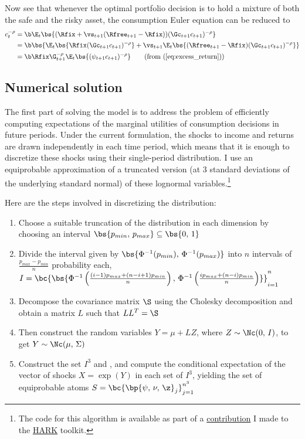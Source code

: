 Now see that whenever the optimal portfolio decision is to hold a mixture of both the safe and the risky asset, the consumption Euler equation can be reduced to
\begin{align*}
    c_{t}^{-\rho} &= \b \E_{t}\bs{(\Rfix + \vs_{t+1}(\Rfree_{t+1} - \Rfix))(\Gc_{t+1}c_{t+1})^{-\rho}}\\
    &= \b \bs{\E_{t}\bs{\Rfix(\Gc_{t+1}c_{t+1})^{-\rho}} + \vs_{t+1}\E_{t}\bs{(\Rfree_{t+1} - \Rfix)(\Gc_{t+1}c_{t+1})^{-\rho}}}\\
    &= \b\Rfix\G_{t+1}^{-\rho}\E_{t}\bs{(\psi_{t+1}c_{t+1})^{-\rho}} \tag{from (\ref{eq:excess_return})}
\end{align*}

\subsection{Numerical solution}\label{discretization}

The first part of solving the model is to address the problem of efficiently computing expectations of the marginal utilities of consumption decisions in future periods. Under the current formulation, the shocks to income and returns are drawn independently in each time period, which means that it is enough to discretize these shocks using their single-period distribution. I use an equiprobable approximation of a truncated version (at 3 standard deviations of the underlying standard normal) of these lognormal variables.\footnote{The code for this algorithm is available as part of a \href{https://github.com/econ-ark/HARK/pull/1412}{contribution} I made to the \href{https://github.com/econ-ark/HARK}{HARK} toolkit.}

Here are the steps involved in discretizing the distribution:
\begin{enumerate}
    \item Choose a suitable truncation of the distribution in each dimension by choosing an interval $\bs{p_{min},\,p_{max}} \subseteq \bs{0,\,1}$
    \item Divide the interval given by $\bs{\Phi^{-1}(p_{min}),\,\Phi^{-1}(p_{max})}$ into $n$ intervals of $\frac{p_{max} - p_{min}}{n}$ probability each, $I = \bc{\bs{\Phi^{-1}\left(\frac{(i - 1)p_{max} + (n - i + 1)p_{min}}{n}\right),\,\Phi^{-1}\left(\frac{ip_{max} + (n - i)p_{min}}{n}\right)}}_{i=1}^{n}$
    \item Decompose the covariance matrix $\S$ using the Cholesky decomposition and obtain a matrix $L$ such that $LL^T = \S$
    \item Then construct the random variables $Y = \mu + LZ$, where $Z \sim \Nc(0,\,I)$, to get $Y \sim \Nc(\mu,\,\Sigma)$
    \item Construct the set $I^3$ and , and compute the conditional expectation of the vector of shocks $X = \exp(Y)$ in each set of $I^3$, yielding the set of equiprobable atoms $S = \bc{\bp{\psi,\,\nu,\,\z}_{j}}_{j=1}^{n^3}$
\end{enumerate}

